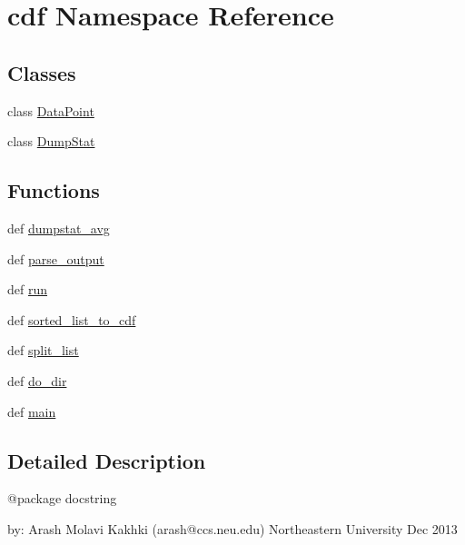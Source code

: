 \hypertarget{namespacecdf}{\section{cdf Namespace Reference}
\label{namespacecdf}
}
\subsection*{Classes}
\begin{DoxyCompactItemize}
\item 
class \hyperlink{classcdf_1_1_data_point}{Data\-Point}
\item 
class \hyperlink{classcdf_1_1_dump_stat}{Dump\-Stat}
\end{DoxyCompactItemize}
\subsection*{Functions}
\begin{DoxyCompactItemize}
\item 
def \hyperlink{namespacecdf_a860c68e20b4f59bbf288a8eea4016372}{dumpstat\-\_\-avg}
\item 
def \hyperlink{namespacecdf_afd91a77a1934a7fe3017b6b684c789d0}{parse\-\_\-output}
\item 
def \hyperlink{namespacecdf_a39ca068c3a42bbf3b662199607b75580}{run}
\item 
def \hyperlink{namespacecdf_ad7e6f86af33bf5afc8354e3ee95d2d84}{sorted\-\_\-list\-\_\-to\-\_\-cdf}
\item 
def \hyperlink{namespacecdf_a8163b6941e77518731e54fa703f671c2}{split\-\_\-list}
\item 
def \hyperlink{namespacecdf_a3c703da63dd8a0d11020ec6a644ed1cc}{do\-\_\-dir}
\item 
def \hyperlink{namespacecdf_ac60a4a166a9b445aa227e76918f38a35}{main}
\end{DoxyCompactItemize}


\subsection{Detailed Description}
\begin{DoxyVerb}@package docstring

by: Arash Molavi Kakhki (arash@ccs.neu.edu)
Northeastern University
Dec 2013\end{DoxyVerb}
 

